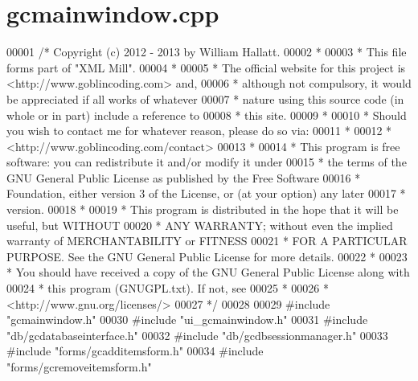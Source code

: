 \hypertarget{gcmainwindow_8cpp_source}{\section{gcmainwindow.\-cpp}
}

\begin{DoxyCode}
00001 \textcolor{comment}{/* Copyright (c) 2012 - 2013 by William Hallatt.}
00002 \textcolor{comment}{ *}
00003 \textcolor{comment}{ * This file forms part of "XML Mill".}
00004 \textcolor{comment}{ *}
00005 \textcolor{comment}{ * The official website for this project is <http://www.goblincoding.com> and,}
00006 \textcolor{comment}{ * although not compulsory, it would be appreciated if all works of whatever}
00007 \textcolor{comment}{ * nature using this source code (in whole or in part) include a reference to}
00008 \textcolor{comment}{ * this site.}
00009 \textcolor{comment}{ *}
00010 \textcolor{comment}{ * Should you wish to contact me for whatever reason, please do so via:}
00011 \textcolor{comment}{ *}
00012 \textcolor{comment}{ *                 <http://www.goblincoding.com/contact>}
00013 \textcolor{comment}{ *}
00014 \textcolor{comment}{ * This program is free software: you can redistribute it and/or modify it
       under}
00015 \textcolor{comment}{ * the terms of the GNU General Public License as published by the Free
       Software}
00016 \textcolor{comment}{ * Foundation, either version 3 of the License, or (at your option) any later}
00017 \textcolor{comment}{ * version.}
00018 \textcolor{comment}{ *}
00019 \textcolor{comment}{ * This program is distributed in the hope that it will be useful, but WITHOUT}
00020 \textcolor{comment}{ * ANY WARRANTY; without even the implied warranty of MERCHANTABILITY or
       FITNESS}
00021 \textcolor{comment}{ * FOR A PARTICULAR PURPOSE.  See the GNU General Public License for more
       details.}
00022 \textcolor{comment}{ *}
00023 \textcolor{comment}{ * You should have received a copy of the GNU General Public License along with}
00024 \textcolor{comment}{ * this program (GNUGPL.txt).  If not, see}
00025 \textcolor{comment}{ *}
00026 \textcolor{comment}{ *                    <http://www.gnu.org/licenses/>}
00027 \textcolor{comment}{ */}
00028 
00029 \textcolor{preprocessor}{#include "gcmainwindow.h"}
00030 \textcolor{preprocessor}{#include "ui\_gcmainwindow.h"}
00031 \textcolor{preprocessor}{#include "db/gcdatabaseinterface.h"}
00032 \textcolor{preprocessor}{#include "db/gcdbsessionmanager.h"}
00033 \textcolor{preprocessor}{#include "forms/gcadditemsform.h"}
00034 \textcolor{preprocessor}{#include "forms/gcremoveitemsform.h"}

\end{DoxyCode}

